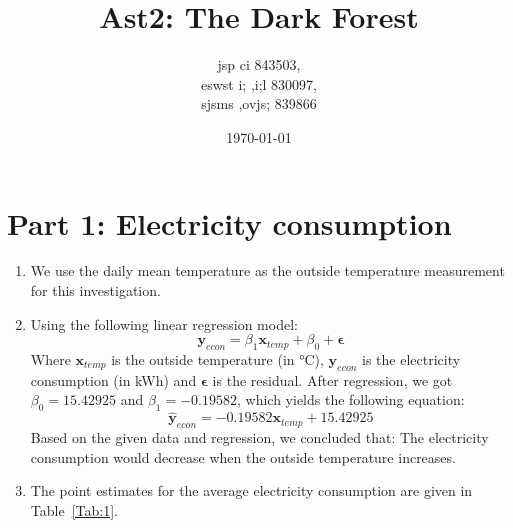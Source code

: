 \documentclass[12pt]{article}
\title{Ast2: The Dark Forest}
\author{jsp ci 843503,\\ 
	eswst i; ,i;l 830097,\\ 
sjsms ,ovjs; 839866}
\date{\today}
\begin{document}
	
\maketitle

\section{Part 1: Electricity consumption}

\begin{enumerate}
	\item We use the daily mean temperature as the outside temperature measurement for this investigation.
	\item Using the following linear regression model:
\[
\mathbf{y}_{econ} = \beta_1 \mathbf{x}_{temp} + \beta_0 + \mathbf{\epsilon}
\] 
Where $\mathbf{x}_{temp}$ is the outside temperature (in °C), $\mathbf{y}_{econ}$ is the electricity consumption (in kWh) and $\mathbf{\epsilon}$ is the residual. After regression, we got $\beta_0 = 15.42925$ and $\beta_1 = -0.19582$, which yields the following equation:
\[
\hat{\mathbf{y}}_{econ} = -0.19582 \mathbf{x}_{temp} + 15.42925
\] 
Based on the given data and regression, we concluded that: 
The electricity consumption would decrease when the outside temperature increases.
\item The point estimates for the average electricity consumption are given in Table~\ref{Tab:1}.


\end{enumerate}
\end{document}
